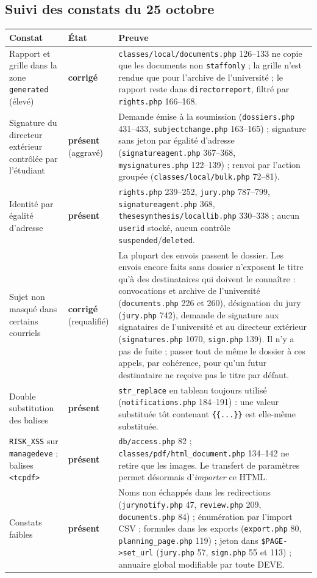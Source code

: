 \documentclass[11pt,a4paper]{article}
\newcommand{\fichier}[1]{\texttt{\small #1}}
\newcommand{\code}[1]{\texttt{#1}}
\newcommand{\corrige}{\textcolor{green!45!black}{\textbf{corrigé}}}
\newcommand{\present}{\textcolor{red!70!black}{\textbf{présent}}}
\begin{document}
\subsection*{Suivi des constats du 25 octobre}

\begin{longtable}{@{}p{4.6cm}p{1.6cm}p{9.3cm}@{}}
\toprule
\textbf{Constat} & \textbf{État} & \textbf{Preuve} \\
\midrule
\endhead
Rapport et grille dans la zone \code{generated} (élevé) & \corrige &
  \fichier{classes/local/documents.php} 126--133 ne copie que les documents non
  \code{staffonly} ; la grille n'est rendue que pour l'archive de l'université ; le rapport reste
  dans \code{directorreport}, filtré par \fichier{rights.php} 166--168. \\
Signature du directeur extérieur contrôlée par l'étudiant & \present{} (aggravé) &
  Demande émise à la soumission (\fichier{dossiers.php} 431--433,
  \fichier{subjectchange.php} 163--165) ; signature sans jeton par égalité d'adresse
  (\fichier{signatureagent.php} 367--368, \fichier{mysignatures.php} 122--139) ; renvoi par
  l'action groupée (\fichier{classes/local/bulk.php} 72--81). \\
Identité par égalité d'adresse & \present &
  \fichier{rights.php} 239--252, \fichier{jury.php} 787--799, \fichier{signatureagent.php} 368,
  \fichier{thesesynthesis/locallib.php} 330--338 ; aucun \code{userid} stocké, aucun contrôle
  \code{suspended}/\code{deleted}. \\
Sujet non masqué dans certains courriels & \corrige{} (requalifié) &
  La plupart des envois passent le dossier. Les envois encore faits sans dossier n'exposent le
  titre qu'à des destinataires qui doivent le connaître : convocations et archive de
  l'université (\fichier{documents.php} 226 et 260), désignation du jury (\fichier{jury.php}
  742), demande de signature aux signataires de l'université et au directeur extérieur
  (\fichier{signatures.php} 1070, \fichier{sign.php} 139). Il n'y a pas de fuite ; passer tout
  de même le dossier à ces appels, par cohérence, pour qu'un futur destinataire ne reçoive pas le
  titre par défaut. \\
Double substitution des balises & \present &
  \code{str\_replace} en tableau toujours utilisé (\fichier{notifications.php} 184--191) : une
  valeur substituée tôt contenant \code{\{\{...\}\}} est elle-même substituée. \\
\code{RISK\_XSS} sur \code{managedeve} ; balises \code{<tcpdf>} & \present &
  \fichier{db/access.php} 82 ; \fichier{classes/pdf/html\_document.php} 134--142 ne retire que les
  images. Le transfert de paramètres permet désormais d'\emph{importer} ce HTML. \\
Constats faibles & \present &
  Noms non échappés dans les redirections (\fichier{jurynotify.php} 47, \fichier{review.php} 209,
  \fichier{documents.php} 84) ; énumération par l'import CSV ; formules dans les exports
  (\fichier{export.php} 80, \fichier{planning\_page.php} 119) ; jeton dans
  \code{\$PAGE->set\_url} (\fichier{jury.php} 57, \fichier{sign.php} 55 et 113) ; annuaire
  global modifiable par toute DEVE. \\
\bottomrule
\end{longtable}
\end{document}
